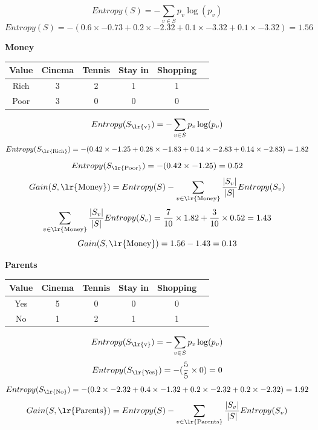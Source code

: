 \documentclass{article}
\newcommand{\tf}[1]{\text{\lr{#1}}}
\begin{document}
	\vspace{5pt}
	\[
	Entropy(S) = -\sum_{v \in S} p_v\log (p_v)
	\]
	\[
	Entropy(S) = -( 0.6 \times -0.73 + 0.2 \times -2.32‌ + 0.1 \times -3.32 + 0.1 \times -3.32) = 1.56
	\]
	\begin{latin}
		\textbf{Money}
		\begin{center}
			\begin{tabular}{|c|c|c|c|c|c|}
				\hline
				Value & Cinema & Tennis & Stay in & Shopping\\
				\hline
				\hline
				Rich & ‌3& 2 & 1 & 1\\
				\hline
				Poor & 3 & 0 & 0 & 0\\
				\hline
			\end{tabular}
		\end{center}
	\end{latin}
	\vspace{5pt}
	\[
	Entropy(S_{\text{\lr{v}}}) = -\sum_{v \in S} p_v\log (p_v)
	\]
	\[
	Entropy(S_{\tf{Rich}}) = -(0.42 \times -1.25 + 0.28 \times -1.83 + 0.14 \times -2.83 + 0.14 \times -2.83) = 1.82
	\]
	\[
	Entropy(S_{\tf{Poor}}) = -(0.42 \times -1.25) = 0.52
	\]
	\vspace{10pt}
	\[
	Gain(S, \tf{Money}) = Entropy(S) - \sum_{v \in \tf{Money}} \frac{| S_v |}{| S |}Entropy(S_v)
	\] 
	\[
	\sum_{v \in \tf{Money}} \frac{| S_v |}{| S |}Entropy(S_v) = \frac{7}{10} \times 1.82 + \frac{3}{10} \times 0.52 = 1.43
	\]
	\[
	Gain(S, \tf{Money}) = 1.56 - 1.43 = 0.13
	\]
	\begin{latin}
		\textbf{Parents}
		\begin{center}
			\begin{tabular}{|c|c|c|c|c|c|}
				\hline
				Value & Cinema & Tennis & Stay in & Shopping\\
				\hline
				\hline
				Yes & ‌5& 0 & 0 & 0\\
				\hline
				No & 1 & 2 & 1 & 1\\
				\hline
			\end{tabular}
		\end{center}
	\end{latin}
	\vspace{5pt}
	\[
	Entropy(S_{\tf{v}}) = -\sum_{v \in S} p_v\log (p_v)
	\]
	\[
	Entropy(S_{\tf{Yes}}) = -(\frac{5}{5} \times 0) = 0
	\]
	\[
	Entropy(S_{\tf{No}}) = -(0.2 \times -2.32 + 0.4 \times -1.32 + 0.2 \times -2.32 + 0.2 \times -2.32) = 1.92
	\]
	\vspace{10pt}
	\[
	Gain(S, \tf{Parents}) = Entropy(S) - \sum_{v \in \tf{Parents}} \frac{| S_v |}{| S |}Entropy(S_v)
	\] 
\end{document}
